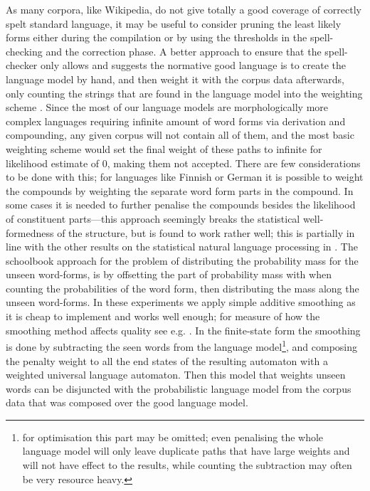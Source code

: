 \documentclass[a4paper,12pt]{article}
\begin{document}
As many corpora, like Wikipedia, do not give totally a good coverage of
correctly spelt standard language, it may be useful to consider pruning the
least likely forms either during the compilation or by using the thresholds in
the spell-checking and the correction phase. A better approach to ensure that
the spell-checker only allows and suggests the normative good language is to
create the language model by hand, and then weight it with the corpus data
afterwards, only counting the strings that are found in the language model into
the weighting scheme \cite[]{pirinen/2009/nodalida}. Since the most of our
language models are morphologically more complex languages requiring infinite
amount of word forms via derivation and compounding, any given corpus will not
contain all of them, and the most basic weighting scheme would set the final
weight of these paths to infinite for likelihood estimate of 0, making them not
accepted. There are few considerations to be done with this; for languages like
Finnish or German \cite[]{schiller2006german} it is possible to weight the
compounds by weighting the separate word form parts in the compound. In some
cases it is needed to further penalise the compounds besides the likelihood of
constituent parts---this approach seemingly breaks the statistical
well-formedness of the structure, but is found to work rather well; this is
partially in line with the other results on the statistical natural language
processing in \cite{brants2007large}. The schoolbook approach for the problem
of distributing the probability mass for the unseen word-forms, is by
offsetting the part of probability mass with when counting the probabilities of
the word form, then distributing the mass along the unseen word-forms\cite[for
a good introduction to smoothing models we refer to][]{jurafsky2000speech}. In
these experiments we apply simple additive smoothing as it is cheap to
implement and works well enough; for measure of how the smoothing method
affects quality see e.g.  \cite{chen1999empirical}. In the finite-state form
the smoothing is done by subtracting the seen words from the language
model\footnote{for optimisation this part may be omitted; even penalising the
    whole language model will only leave duplicate paths that have large
    weights and will not have effect to the results, while counting the
subtraction may often be very resource heavy.}, and composing the penalty
weight to all the end states of the resulting automaton with a weighted
universal language automaton. Then this model that weights unseen words can be
disjuncted with the probabilistic language model from the corpus data that was
composed over the good language model.
\end{document}
